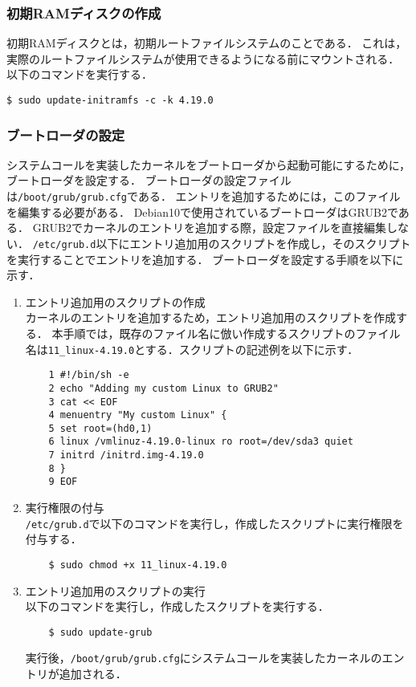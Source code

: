 \documentclass[12pt]{jsarticle}
\begin{document}
\subsubsection{初期RAMディスクの作成}
初期RAMディスクとは，初期ルートファイルシステムのことである．
これは，実際のルートファイルシステムが使用できるようになる前にマウントされる．
以下のコマンドを実行する．
\begin{verbatim}
$ sudo update-initramfs -c -k 4.19.0
\end{verbatim}

\subsubsection{ブートローダの設定}
システムコールを実装したカーネルをブートローダから起動可能にするために，ブートローダを設定する．
ブートローダの設定ファイルは\verb|/boot/grub/grub.cfg|である．
エントリを追加するためには，このファイルを編集する必要がある．
Debian10で使用されているブートローダはGRUB2である．
GRUB2でカーネルのエントリを追加する際，設定ファイルを直接編集しない．
\verb|/etc/grub.d|以下にエントリ追加用のスクリプトを作成し，そのスクリプトを実行することでエントリを追加する．
ブートローダを設定する手順を以下に示す．
\begin{enumerate}
\item エントリ追加用のスクリプトの作成\\
	カーネルのエントリを追加するため，エントリ追加用のスクリプトを作成する．
	本手順では，既存のファイル名に倣い作成するスクリプトのファイル名は\verb|11_linux-4.19.0|とする．スクリプトの記述例を以下に示す．
	\begin{verbatim}
	1 #!/bin/sh -e
	2 echo "Adding my custom Linux to GRUB2"
	3 cat << EOF
	4 menuentry "My custom Linux" {
	5 set root=(hd0,1)
	6 linux /vmlinuz-4.19.0-linux ro root=/dev/sda3 quiet
	7 initrd /initrd.img-4.19.0
	8 }
	9 EOF
	\end{verbatim}

\item 実行権限の付与\\
	\verb|/etc/grub.d|で以下のコマンドを実行し，作成したスクリプトに実行権限を付与する．
	\begin{verbatim}
	$ sudo chmod +x 11_linux-4.19.0
	\end{verbatim}
	
\item エントリ追加用のスクリプトの実行\\
	以下のコマンドを実行し，作成したスクリプトを実行する．
	\begin{verbatim}
	$ sudo update-grub
	\end{verbatim}
	実行後，\verb|/boot/grub/grub.cfg|にシステムコールを実装したカーネルのエントリが追加される．

\end{enumerate}
\end{document}
